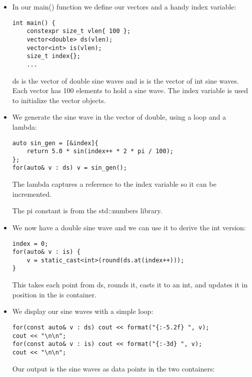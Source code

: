\begin{itemize}
\item 
In our main() function we define our vectors and a handy index variable:

\begin{lstlisting}[style=styleCXX]
int main() {
	constexpr size_t vlen{ 100 };
	vector<double> ds(vlen);
	vector<int> is(vlen);
	size_t index{};
	...
\end{lstlisting}

ds is the vector of double sine waves and is is the vector of int sine waves. Each vector has 100 elements to hold a sine wave. The index variable is used to initialize the vector objects.

\item We generate the sine wave in the vector of double, using a loop and a lambda:

\begin{lstlisting}[style=styleCXX]
auto sin_gen = [&index]{
	return 5.0 * sin(index++ * 2 * pi / 100);
};
for(auto& v : ds) v = sin_gen();
\end{lstlisting}

The lambda captures a reference to the index variable so it can be incremented.

The pi constant is from the std::numbers library.

\item 
We now have a double sine wave and we can use it to derive the int version:

\begin{lstlisting}[style=styleCXX]
index = 0;
for(auto& v : is) {
	v = static_cast<int>(round(ds.at(index++)));
}
\end{lstlisting}

This takes each point from ds, rounds it, casts it to an int, and updates it in position in the is container.

\item 
We display our sine waves with a simple loop:

\begin{lstlisting}[style=styleCXX]
for(const auto& v : ds) cout << format("{:-5.2f} ", v);
cout << "\n\n";
for(const auto& v : is) cout << format("{:-3d} ", v);
cout << "\n\n";
\end{lstlisting}

Our output is the sine waves as data points in the two containers:


\end{itemize}

